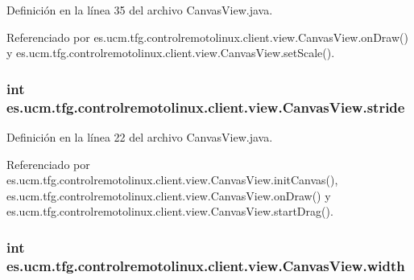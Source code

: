 Definición en la línea 35 del archivo Canvas\-View.\-java.



Referenciado por es.\-ucm.\-tfg.\-controlremotolinux.\-client.\-view.\-Canvas\-View.\-on\-Draw() y es.\-ucm.\-tfg.\-controlremotolinux.\-client.\-view.\-Canvas\-View.\-set\-Scale().

\hypertarget{classes_1_1ucm_1_1tfg_1_1controlremotolinux_1_1client_1_1view_1_1CanvasView_a63fe13f7edde39580f52dc14375feb08}{
\subsubsection[{stride}]{\setlength{\rightskip}{0pt plus 5cm}int es.\-ucm.\-tfg.\-controlremotolinux.\-client.\-view.\-Canvas\-View.\-stride\hspace{0.3cm}{\ttfamily [private]}}}\label{classes_1_1ucm_1_1tfg_1_1controlremotolinux_1_1client_1_1view_1_1CanvasView_a63fe13f7edde39580f52dc14375feb08}


Definición en la línea 22 del archivo Canvas\-View.\-java.



Referenciado por es.\-ucm.\-tfg.\-controlremotolinux.\-client.\-view.\-Canvas\-View.\-init\-Canvas(), es.\-ucm.\-tfg.\-controlremotolinux.\-client.\-view.\-Canvas\-View.\-on\-Draw() y es.\-ucm.\-tfg.\-controlremotolinux.\-client.\-view.\-Canvas\-View.\-start\-Drag().

\hypertarget{classes_1_1ucm_1_1tfg_1_1controlremotolinux_1_1client_1_1view_1_1CanvasView_a8a78b8d52c5a8dee1efc232c3b785f7e}{
\subsubsection[{width}]{\setlength{\rightskip}{0pt plus 5cm}int es.\-ucm.\-tfg.\-controlremotolinux.\-client.\-view.\-Canvas\-View.\-width\hspace{0.3cm}{\ttfamily [private]}}}\label{classes_1_1ucm_1_1tfg_1_1controlremotolinux_1_1client_1_1view_1_1CanvasView_a8a78b8d52c5a8dee1efc232c3b785f7e}



